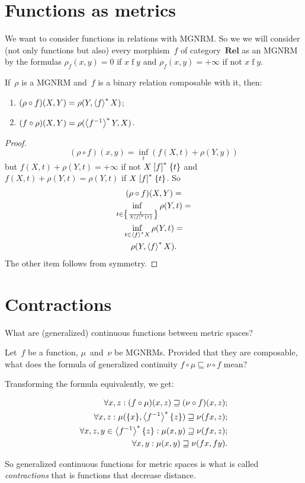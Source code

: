 
\section{Functions as metrics}

We want to consider functions in relations with MGNRM. So we we will consider (not only functions but also) every morphism~$f$ of category~$\mathbf{Rel}$ as an MGNRM by the formulas $\rho_{f}(x,y) = 0$ if $x\mathrel{f}y$ and $\rho_{f}(x,y) = +\infty$ if not $x\mathrel{f}y$.

\begin{thm}
If~$\rho$ is a MGNRM and~$f$ is a binary relation composable with it, then:
\begin{enumerate}
\item $(\rho\circ f)(X,Y) = \rho(Y,\left\langle f\right\rangle ^{\ast}X)$;
\item $(f\circ\rho)(X,Y) = \rho(\left\langle f^{-1}\right\rangle ^{\ast}Y,X)$.
\end{enumerate}
\end{thm}

\begin{proof}
~
\[
(\rho\circ f)(x,y) = \inf_{t}(f(X,t) + \rho(Y,y))
\]
but $f(X,t) + \rho(Y,t) = +\infty$ if not $X\mathrel{\left[f\right]^{\ast}}\{t\}$ and $f(X,t) + \rho(Y,t) = \rho(Y,t)$ if $X\mathrel{\left[f\right]^{\ast}}\{t\}$. So
\begin{multline*}
(\rho\circ f)(X,Y) = \\
\inf_{t\in\left\{ \frac{t}{X\mathrel{\left[f\right]^{\ast}}\{t\}}\right\}}\rho(Y,t) = \\
\inf_{t\in\left\langle f\right\rangle ^{\ast}X}\rho(Y,t) = \\
\rho(Y,\left\langle f\right\rangle ^{\ast}X).
\end{multline*}
The other item follows from symmetry.
\end{proof}
    
\section{Contractions}

What are (generalized) continuous functions between metric spaces?

Let~$f$ be a function, $\mu$~and~$\nu$ be MGNRMs. Provided that they are composable, what does the formula of generalized continuity $f\circ\mu\sqsubseteq\nu\circ f$ mean?

Transforming the formula equivalently, we get:

\begin{align*}
\forall x,z: (f\circ\mu)(x,z)\sqsupseteq(\nu\circ f)(x,z);\\
\forall x,z: \mu(\{x\},\left\langle f^{-1}\right\rangle ^{\ast}\{z\})\sqsupseteq\nu(fx,z);\\
\forall x,z,y\in\left\langle f^{-1}\right\rangle ^{\ast}\{z\}: \mu(x,y)\sqsupseteq\nu(fx,z);\\
\forall x,y: \mu(x,y)\sqsupseteq\nu(fx,fy).
\end{align*}

So generalized continuous functions for metric spaces is what is called \emph{contractions} that is functions that decrease distance.
